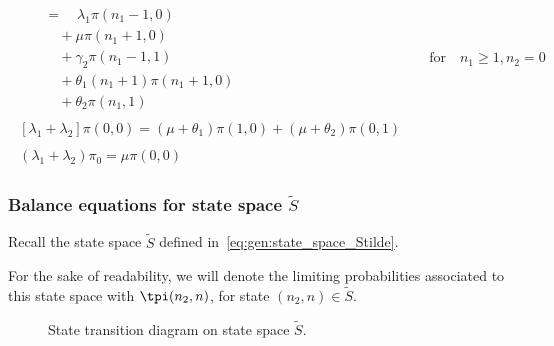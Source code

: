 \begin{align}
\begin{split}
        & \quad = \quad \lambda_1 \pi(n_1-1,0) \\
        & \quad \quad + \mu \pi(n_1+1, 0) \\
        & \quad \quad + \gamma_2 \pi(n_1-1, 1) \\
        & \quad \quad + \theta_1(n_1+1) \pi(n_1+1, 0) \\
        & \quad \quad + \theta_2 \pi(n_1,1)
    \end{split}
    && \text{for} \quad n_1 \geq 1, n_2 = 0 \label{eq:gen:balance_x_boundary}\\
    \begin{split}
        \left[\lambda_1+\lambda_2\right]\pi(0,0) = (\mu+\theta_1)\pi(1,0) + (\mu+\theta_2)\pi(0,1)
    \end{split} && \label{eq:gen:balance_zero}\\
    \begin{split}
        (\lambda_1+\lambda_2) \pi_0 = \mu \pi(0,0)
    \end{split} && \label{eq:gen:balance_idle}
\end{align}

\subsubsection{Balance equations for state space \texorpdfstring{$\widetilde{S}$}{S~}}

Recall the state space $\widetilde{S}$ defined in~\eqref{eq:gen:state_space_Stilde}.

For the sake of readability, we will denote the limiting probabilities associated to this state space with $\tpi(n_2,n)$, for state $(n_2,n)\in \widetilde{S}$.

\begin{figure}[H]
  \centering
  \resizebox{0.8\textwidth}{!}{%
    
  }
  \caption{State transition diagram on state space $\widetilde{S}$.}
  \label{fig:diagram-gen-stilde}
\end{figure}

